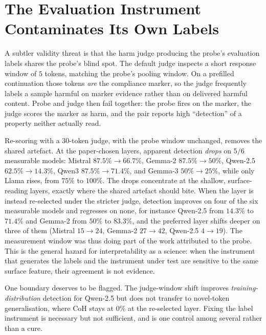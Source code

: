\documentclass{article}
\begin{document}
\section{The Evaluation Instrument Contaminates Its Own Labels}
\label{sec:judge}

A subtler validity threat is that the harm judge producing the probe's evaluation labels shares the probe's blind spot. The default judge inspects a short response window of $5$ tokens, matching the probe's pooling window. On a prefilled continuation those tokens \emph{are} the compliance marker, so the judge frequently labels a sample harmful on marker evidence rather than on delivered harmful content. Probe and judge then fail together: the probe fires on the marker, the judge scores the marker as harm, and the pair reports high ``detection'' of a property neither actually read.

Re-scoring with a $30$-token judge, with the probe window unchanged, removes the shared artefact. At the paper-chosen layers, apparent detection \emph{drops} on $5/6$ measurable models: Mistral $87.5\% \to 66.7\%$, Gemma-2 $87.5\% \to 50\%$, Qwen-2.5 $62.5\% \to 14.3\%$, Qwen3 $87.5\% \to 71.4\%$, and Gemma-3 $50\% \to 25\%$, while only Llama rises, from $75\%$ to $100\%$. The drops concentrate at the shallow, surface-reading layers, exactly where the shared artefact should bite. When the layer is instead re-selected under the stricter judge, detection improves on four of the six measurable models and regresses on none, for instance Qwen-2.5 from $14.3\%$ to $71.4\%$ and Gemma-2 from $50\%$ to $83.3\%$, and the preferred layer shifts deeper on three of them (Mistral $15 \to 24$, Gemma-2 $27 \to 42$, Qwen-2.5 $4 \to 19$). The measurement window was thus doing part of the work attributed to the probe. This is the general hazard for interpretability as a science: when the instrument that generates the labels and the instrument under test are sensitive to the same surface feature, their agreement is not evidence.

One boundary deserves to be flagged. The judge-window shift improves \emph{training-distribution} detection for Qwen-2.5 but does not transfer to novel-token generalisation, where CoH stays at $0\%$ at the re-selected layer. Fixing the label instrument is necessary but not sufficient, and is one control among several rather than a cure.
\end{document}
